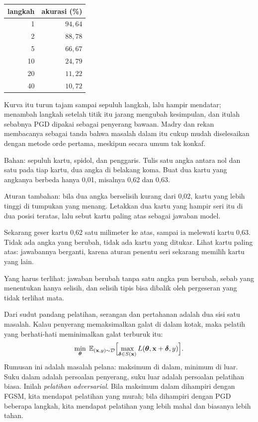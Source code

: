 \begin{center}
\begin{tabular}{rr}
\hline
langkah & akurasi (\%) \\
\hline
1  & $94{,}64$ \\
2  & $88{,}78$ \\
5  & $66{,}67$ \\
10 & $24{,}79$ \\
20 & $11{,}22$ \\
40 & $10{,}72$ \\
\hline
\end{tabular}
\end{center}

Kurva itu turun tajam sampai sepuluh langkah, lalu hampir mendatar; menambah langkah
setelah titik itu jarang mengubah kesimpulan, dan itulah sebabnya PGD dipakai sebagai
penyerang bawaan. Madry dan rekan membacanya sebagai tanda bahwa masalah dalam itu
cukup mudah diselesaikan dengan metode orde pertama, meskipun secara umum tak konkaf.

\begin{tangan}
Bahan: sepuluh kartu, spidol, dan penggaris. Tulis satu angka antara nol dan satu pada
tiap kartu, dua angka di belakang koma. Buat dua kartu yang angkanya berbeda hanya
0,01, misalnya 0,62 dan 0,63.

Aturan tambahan: bila dua angka berselisih kurang dari 0,02, kartu yang lebih tinggi di
tumpukan yang menang. Letakkan dua kartu yang hampir seri itu di dua posisi teratas,
lalu sebut kartu paling atas sebagai jawaban model.

Sekarang geser kartu 0,62 satu milimeter ke atas, sampai ia melewati kartu 0,63. Tidak
ada angka yang berubah, tidak ada kartu yang ditukar. Lihat kartu paling atas:
jawabannya berganti, karena aturan penentu seri sekarang memilih kartu yang lain.

Yang harus terlihat: jawaban berubah tanpa satu angka pun berubah, sebab yang
menentukan hanya selisih, dan selisih tipis bisa dibalik oleh pergeseran yang tidak
terlihat mata.
\end{tangan}

Dari sudut pandang pelatihan, serangan dan pertahanan adalah dua sisi satu masalah.
Kalau penyerang memaksimalkan galat di dalam kotak, maka pelatih yang berhati-hati
meminimalkan galat terburuk itu:
\[
  \min_{\boldsymbol{\theta}}\;
  \mathbb{E}_{(\mathbf{x},y)\sim\mathcal{D}}
  \Bigl[\max_{\boldsymbol{\delta}\in S(\mathbf{x})}
  L(\boldsymbol{\theta},\mathbf{x}+\boldsymbol{\delta},y)\Bigr].
\]
Rumusan ini adalah masalah pelana: maksimum di dalam, minimum di luar. Suku dalam
adalah persoalan penyerang, suku luar adalah persoalan pelatihan biasa. Inilah
\emph{pelatihan adversarial}. Bila maksimum dalam dihampiri dengan FGSM, kita
mendapat pelatihan yang murah; bila dihampiri dengan PGD beberapa langkah, kita
mendapat pelatihan yang lebih mahal dan biasanya lebih tahan.

